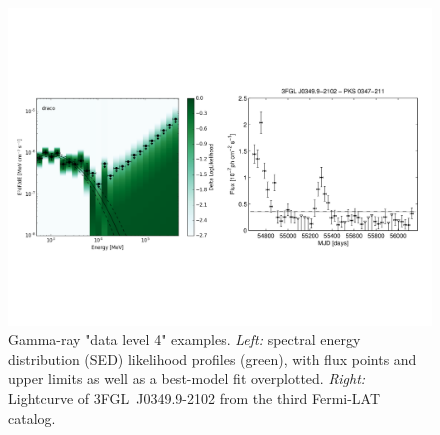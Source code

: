 \begin{figure}[tb]
\centerline{\includegraphics[width=\textwidth]{figures/dl4-examples}}
\caption{
Gamma-ray "data level 4" examples. \emph{Left:} spectral energy distribution (SED) likelihood profiles (green), with flux points and upper limits as well
as a best-model fit overplotted. \emph{Right:} Lightcurve of 3FGL~J0349.9-2102 from the third Fermi-LAT catalog.
}
\label{fig:dl4-examples}
\end{figure}
